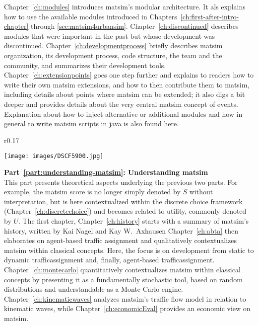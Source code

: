 Chapter~\ref{ch:modules} introduces \gls{matsim}'s modular architecture. It als explains how to use the available \glspl{module} introduced in Chapters~\ref{ch:first-after-intro-chapter} through \ref{sec:matsim4urbansim}. 
Chapter~\ref{ch:discontinued} describes modules that were important in the past but whose development was discontinued.
Chapter~\ref{ch:developmentprocess} briefly describes \gls{matsim} organization, \ie its development process, code structure, the team and the community, and summarizes their development tools. 
Chapter~\ref{ch:extensionpoints} goes one step further and explains to readers how to write their own \gls{matsim} \glspl{extension}, and how to then contribute them to \gls{matsim}, including details about points where \gls{matsim} can be extended; it also digs a bit deeper and provides details about the very central \gls{matsim} concept of \glspl{event}. Explanation about how to 
inject alternative or additional modules and 
how in general to write \gls{matsim} scripts in \gls{java} is also found here.

\begin{wrapfigure}[7]{r}{0.17\textwidth}
\vspace{-10pt}
  \begin{center}
    \texttt{[image: images/DSCF5900.jpg]}
  \end{center}
\end{wrapfigure}
\textbf{Part~\ref{part:understanding-matsim}: Understanding \acrshort{matsim}}\\
%
This part presents theoretical aspects underlying the previous two parts. For example, the \gls{matsim} \gls{score} is no longer simply denoted by $S$ without interpretation, but is here contextualized within the discrete choice framework (Chapter~\ref{ch:discretechoice}) and becomes related to \gls{utility}, commonly denoted by $U$. 
The first chapter, Chapter~\ref{ch:history} starts with a summary of \gls{matsim}'s history, written by Kai Nagel and Kay W.\ Axhausen
Chapter~\ref{ch:abta} then elaborates on agent-based traffic assignment and qualitatively contextualizes \gls{matsim} within classical concepts. Here, the focus is on development from static to dynamic \gls{trafficassignment} and, finally, agent-based \gls{trafficassignment}.  
Chapter~\ref{ch:montecarlo} quantitatively contextualizes \gls{matsim} within classical concepts by presenting it as a fundamentally stochastic tool, based on random distributions and understandable as a Monte Carlo engine.
Chapter~\ref{ch:kinematicwaves} analyzes \gls{matsim}'s traffic flow model in relation to kinematic waves, while Chapter~\ref{ch:economicEval} provides an economic view on \gls{matsim}. 

